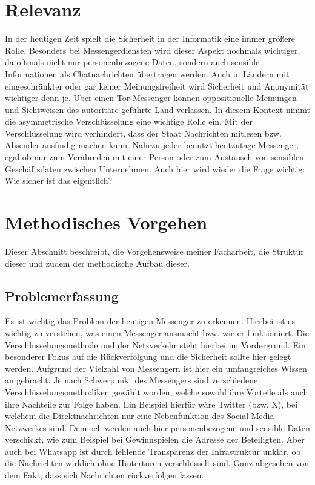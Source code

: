 \documentclass[a4paper,10pt,ngerman,
  headheight=28pt,]{scrartcl}
\begin{document}
\section{Relevanz}
In der heutigen Zeit spielt die Sicherheit in der Informatik eine immer größere Rolle. Besonders bei Messengerdiensten wird dieser Aspekt nochmals wichtiger, da oftmals nicht nur personenbezogene Daten, sondern auch sensible Informationen als Chatnachrichten übertragen werden. Auch in Ländern mit eingeschränkter oder gar keiner Meinungsfreiheit wird Sicherheit und Anonymität wichtiger denn je. Über einen Tor-Messenger können oppositionelle Meinungen und Sichtweisen das autoritäre geführte Land verlassen. In diesem Kontext nimmt die asymmetrische Verschlüsselung eine wichtige Rolle ein. Mit der Verschlüsselung wird verhindert, dass der Staat Nachrichten mitlesen bzw. Absender ausfindig machen kann. Nahezu jeder benutzt heutzutage Messenger, egal ob nur zum Verabreden mit einer Person oder zum Austausch von sensiblen Geschäftsdaten zwischen Unternehmen. Auch hier wird wieder die Frage wichtig: \glqq Wie sicher ist das eigentlich?\grqq

\section{Methodisches Vorgehen}
Dieser Abschnitt beschreibt, die Vorgehensweise meiner Facharbeit, die Struktur dieser und zudem der methodische Aufbau dieser.

\subsection{Problemerfassung}
Es ist wichtig das Problem der heutigen Messenger zu erkennen. Hierbei ist es wichtig zu verstehen, was einen Messenger ausmacht bzw. wie er funktioniert. Die Verschlüsselungsmethode und der Netzverkehr steht hierbei im Vordergrund. Ein besonderer Fokus auf die Rückverfolgung und die Sicherheit sollte hier gelegt werden. Aufgrund der Vielzahl von Messengern ist hier ein umfangreiches Wissen an gebracht. Je nach Schwerpunkt des Messengers sind verschiedene Verschlüsselungsmethodiken gewählt worden, welche sowohl ihre Vorteile als auch ihre Nachteile zur Folge haben. Ein Beispiel hierfür wäre Twitter (bzw. X), bei welchem die Direktnachrichten nur eine \glqq Nebenfunktion \grqq des Social-Media-Netzwerkes sind. Dennoch werden auch hier personenbezogene und sensible Daten verschickt, wie zum Beispiel bei Gewinnspielen die Adresse der Beteiligten. Aber auch bei Whatsapp ist durch fehlende Transparenz der Infrastruktur unklar, ob die Nachrichten wirklich ohne Hintertüren verschlüsselt sind. Ganz abgesehen von dem Fakt, dass sich Nachrichten rückverfolgen lassen.
\end{document}
